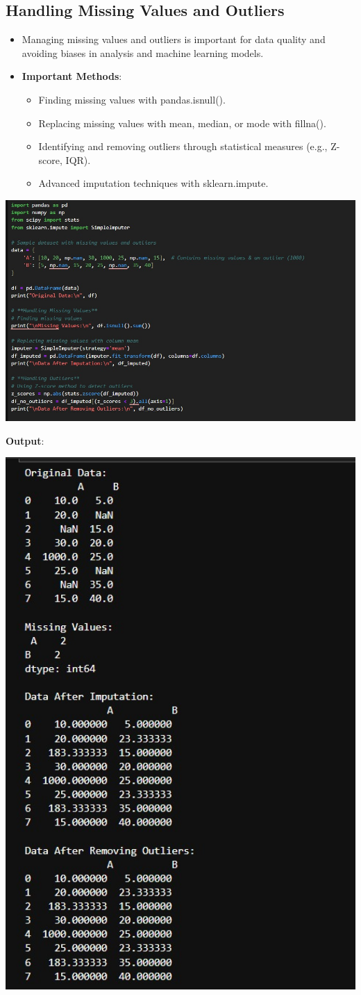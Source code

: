 \documentclass{article}
\begin{document}
\subsection{Handling Missing Values and Outliers}
\begin{itemize}
    \item Managing missing values and outliers is important for data quality and avoiding biases in analysis and machine learning models.
\item \textbf{Important Methods}:
    \begin{itemize}
    \item Finding missing values with pandas.isnull().
    \item Replacing missing values with mean, median, or mode with fillna().
    \item Identifying and removing outliers through statistical measures (e.g., Z-score, IQR).
    \item Advanced imputation techniques with sklearn.impute.
    \end{itemize}
\end{itemize}
\includegraphics[width=14cm,height=12
cm]{HandlingMissing.jpeg}

\textbf{Output}:

\includegraphics[width=14cm,height=4
cm]{HandlingMissing_Output.jpeg}
\newpage
\end{document}
